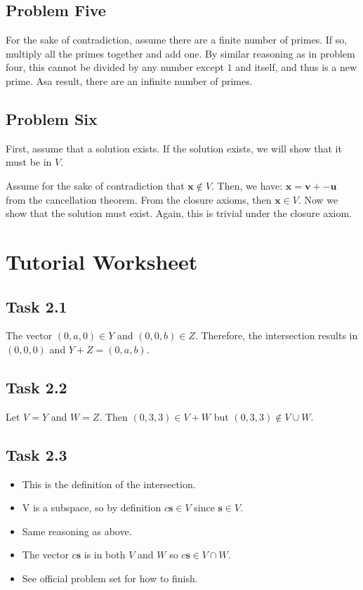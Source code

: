 \documentclass{article}
\begin{document}
\subsection*{Problem Five}
For the sake of contradiction, assume there are a finite number of primes. If so, multiply all the primes together and add one. By similar reasoning as in problem four, this cannot be divided by any number except $1$ and itself, and thus is a new prime. Asa  result, there are an infinite number of primes.
\subsection*{Problem Six}
First, assume that a solution exists. If the solution exists, we will show that it must be in $V$.

Assume for the sake of contradiction that $\bm{x} \notin V$. Then, we have: $\bm{x} = \bm{v} + -\bm{u}$ from the cancellation theorem. From the closure axioms, then $\bm{x} \in V$. Now we show that the solution must exist. Again, this is trivial under the closure axiom.
\section{Tutorial Worksheet}
\subsection*{Task 2.1}
The vector $(0,a,0) \in Y$ and $(0,0,b) \in Z$. Therefore, the intersection results in $(0,0,0)$ and $Y+Z = (0,a,b)$.
\subsection*{Task 2.2}
Let $V = Y$ and $W = Z$. Then $(0,3,3) \in V+W$ but $(0,3,3) \notin V \cup W$.
\subsection*{Task 2.3}
\begin{itemize}
    \item This is the definition of the intersection.
    \item V is a subspace, so by definition $c\bm{s} \in V$ since $\bm{s} \in V$.
    \item Same reasoning as above.
    \item The vector $c\bm{s}$ is in both $V$ and $W$ so $c\bm{s} \in V \cap W$.
    \item See official problem set for how to finish.
\end{itemize}
\end{document}
